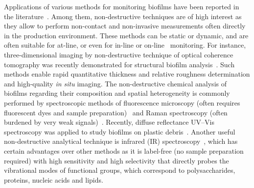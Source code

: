 \documentclass[foods,article,submit,moreauthors,pdftex]{Definitions/mdpi}
\begin{document}
Applications of various methods for monitoring biofilms have been reported in the literature~\cite{wilson_quantitative_2017}. Among them, non-destructive techniques are of high interest as they allow to perform non-contact and non-invasive measurements often directly in the production environment. These methods can be static or dynamic, and are often suitable for at-line, or even for in-line or on-line~\cite{janknecht_online_2003,doi:10.1177/0960336020978716} monitoring. For instance, three-dimensional imaging by non-destructive technique of optical coherence tomography was recently demonstrated for structural biofilm analysis~\cite{ogrodzki_rapid_2017,wagner_optical_2017,desmond_physical_2018,hou_bacterial_2019}. Such methods enable rapid quantitative thickness and relative roughness determination and high-quality \textit{in situ} imaging. The non-destructive chemical analysis of biofilms regarding their composition and spatial heterogeneity is commonly performed by spectroscopic methods of fluorescence microscopy (often requires fluorescent dyes and sample preparation)~\cite{daddi_oubekka_correlative_2012,bogachev_fast_2018} and Raman spectroscopy (often burdened by very weak signals)~\cite{sandt_confocal_2007,chemosensors6010005,ijms21113811}. Recently, diffuse reflectance UV–Vis spectroscopy was applied to study biofilms on plastic debris~\cite{Tziourrou_diffuse_PET_2020}. Another useful non-destructive analytical technique is infrared (IR) spectroscopy~\cite{chalmers_handbook_2001}, which has certain advantages over other methods as it is label-free (no sample preparation required) with high sensitivity and high selectivity that directly probes the vibrational modes of functional groups, which correspond to polysaccharides, proteins, nucleic acids and lipids. 
\end{document}
